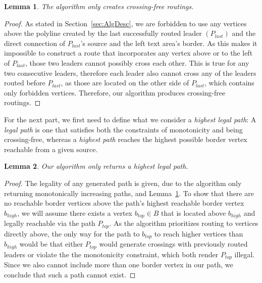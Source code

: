 \documentclass[11pt,a4paper]{vutinfth}
\newtheorem{lemma}{Lemma}
\begin{document}
\begin{lemma}
	The algorithm only creates crossing-free routings.
	\label{lem:CrosFree}
\end{lemma}
\begin{proof}
	As stated in Section~\ref*{sec:AlgDesc}, we are forbidden to use any vertices above the polyline created by the last successfully routed leader $(P_{last})$ and the direct connection of $P_{last}$'s source and the left text area's border. As this makes it impossible to construct a route that incorporates any vertex above or to the left of $P_{last}$, those two leaders cannot possibly cross each other. This is true for any two consecutive leaders, therefore each leader also cannot cross any of the leaders routed before $P_{last}$, as those are located on the other side of $P_{last}$, which contains only forbidden vertices.
	Therefore, our algorithm produces crossing-free routings.
\end{proof}

For the next part, we first need to define what we consider a \emph{highest legal path}: A \emph{legal path} is one that satisfies both the constraints of monotonicity and being crossing-free, whereas a \emph{highest path} reaches the highest possible border vertex reachable from a given source.

\begin{lemma}
	Our algorithm only returns a highest legal path.
	\label{lem:High}
\end{lemma}
\begin{proof}
	The legality of any generated path is given, due to the algorithm only returning monotonically increasing paths, and Lemma~\ref*{lem:CrosFree}. To show that there are no reachable border vertices above the path's highest reachable border vertex $b_{high}$, we will assume there exists a vertex $b_{top} \in B$ that is located above $b_{high}$ and legally reachable via the path $P_{top}$. As the algorithm prioritizes routing to vertices directly above, the only way for the path to $b_{top}$ to reach higher vertices than $b_{high}$ would be that either $P_{top}$ would generate crossings with previously routed leaders or violate the the monotonicity constraint, which both render $P_{top}$ illegal. Since we also cannot include more than one border vertex in our path, we conclude that such a path cannot exist.
\end{proof}
\end{document}
